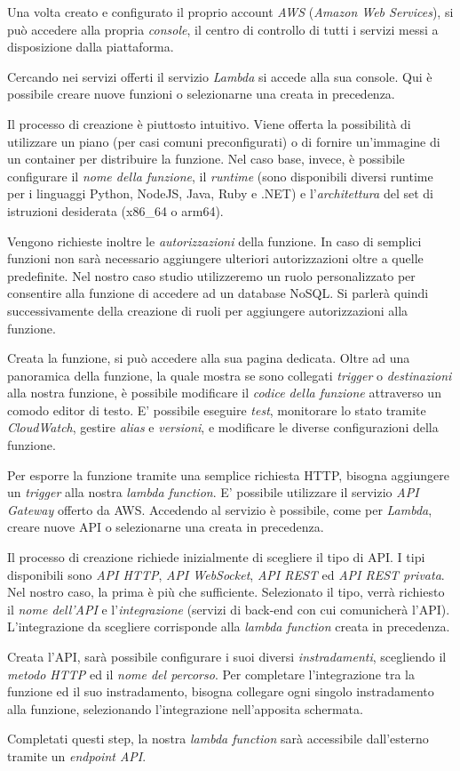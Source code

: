Una volta creato e configurato il proprio account \textit{AWS} (\textit{Amazon Web Services}), si può accedere alla propria \textit{console}, il centro di controllo di tutti i servizi messi a disposizione dalla piattaforma.

Cercando nei servizi offerti il servizio \textit{Lambda} si accede alla sua console. Qui è possibile creare nuove funzioni o selezionarne una creata in precedenza.

Il processo di creazione è piuttosto intuitivo. Viene offerta la possibilità di utilizzare un piano (per casi comuni preconfigurati) o di fornire un'immagine di un container per distribuire la funzione. Nel caso base, invece, è possibile configurare il \textit{nome della funzione}, il \textit{runtime} (sono disponibili diversi runtime per i linguaggi Python, NodeJS, Java, Ruby e .NET) e l'\textit{architettura} del set di istruzioni desiderata (x86\_64 o arm64).

Vengono richieste inoltre le \textit{autorizzazioni} della funzione. In caso di semplici funzioni non sarà necessario aggiungere ulteriori autorizzazioni oltre a quelle predefinite. Nel nostro caso studio utilizzeremo un ruolo personalizzato per consentire alla funzione di accedere ad un database NoSQL. Si parlerà quindi successivamente della creazione di ruoli per aggiungere autorizzazioni alla funzione.

Creata la funzione, si può accedere alla sua pagina dedicata. Oltre ad una panoramica della funzione, la quale mostra se sono collegati \textit{trigger} o \textit{destinazioni} alla nostra funzione, è possibile modificare il \textit{codice della funzione} attraverso un comodo editor di testo. E' possibile eseguire \textit{test}, monitorare lo stato tramite \textit{CloudWatch}, gestire \textit{alias} e \textit{versioni}, e modificare le diverse configurazioni della funzione.

Per esporre la funzione tramite una semplice richiesta HTTP, bisogna aggiungere un \textit{trigger} alla nostra \textit{lambda function}. E' possibile utilizzare il servizio \textit{API Gateway} offerto da AWS. Accedendo al servizio è possibile, come per \textit{Lambda}, creare nuove API o selezionarne una creata in precedenza.

Il processo di creazione richiede inizialmente di scegliere il tipo di API. I tipi disponibili sono \textit{API HTTP}, \textit{API WebSocket}, \textit{API REST} ed \textit{API REST privata}. Nel nostro caso, la prima è più che sufficiente.
Selezionato il tipo, verrà richiesto il \textit{nome dell'API} e l'\textit{integrazione} (servizi di back-end con cui comunicherà l'API). L'integrazione da scegliere corrisponde alla \textit{lambda function} creata in precedenza.

Creata l'API, sarà possibile configurare i suoi diversi \textit{instradamenti}, scegliendo il \textit{metodo HTTP} ed il \textit{nome del percorso}. Per completare l'integrazione tra la funzione ed il suo instradamento, bisogna collegare ogni singolo instradamento alla funzione, selezionando l'integrazione nell'apposita schermata.

Completati questi step, la nostra \textit{lambda function} sarà accessibile dall'esterno tramite un \textit{endpoint API}.